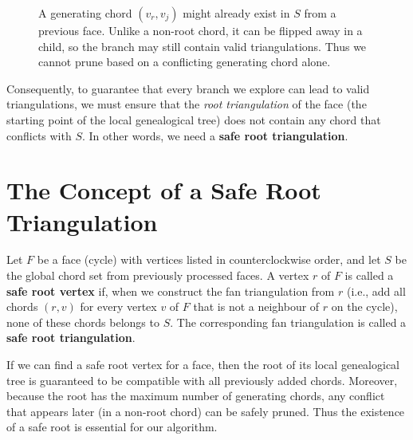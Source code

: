 \begin{figure}[htbp]
    \centering
    \caption{A generating chord \((v_r, v_j)\) might already exist in \(S\) from a previous face. 
    Unlike a non-root chord, it can be flipped away in a child, so the branch may still contain valid triangulations. 
    Thus we cannot prune based on a conflicting generating chord alone.}
    \label{fig:generating_chord_conflict}
\end{figure}

Consequently, to guarantee that every branch we explore can lead to valid triangulations, we must ensure that the \emph{root triangulation} of the face (the starting point of the local genealogical tree) does not contain any chord that conflicts with \(S\). 
In other words, we need a \textbf{safe root triangulation}.

\section{The Concept of a Safe Root Triangulation}
\label{sec:safe_root_concept}

\begin{definition}
    \label{def:safe_root}
    Let \(F\) be a face (cycle) with vertices listed in counterclockwise order, and let \(S\) be the global chord set from previously processed faces. 
    A vertex \(r\) of \(F\) is called a \textbf{safe root vertex} if, when we construct the fan triangulation from \(r\) (i.e., add all chords \((r, v)\) for every vertex \(v\) of \(F\) that is not a neighbour of \(r\) on the cycle), none of these chords belongs to \(S\). 
    The corresponding fan triangulation is called a \textbf{safe root triangulation}.
\end{definition}

If we can find a safe root vertex for a face, then the root of its local genealogical tree is guaranteed to be compatible with all previously added chords. 
Moreover, because the root has the maximum number of generating chords, any conflict that appears later (in a non-root chord) can be safely pruned. 
Thus the existence of a safe root is essential for our algorithm.

